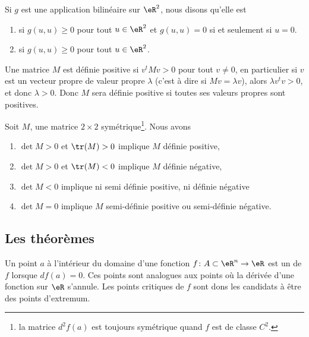 Si $g$ est une application bilinéaire sur $\eR^2$, nous disons qu'elle est
\begin{enumerate}

\item
{} si $g(u,u)\geq 0$ pour tout $u\in\eR^2$ et $g(u,u)=0$ si et seulement si $u=0$.

\item
{} si $g(u,u)\geq 0$ pour tout $u\in\eR^2$. 

\end{enumerate}

Une matrice $M$ est définie positive si $v^tMv>0$ pour tout $v\neq 0$, en particulier si $v$ est un vecteur propre de valeur propre $\lambda$ (c'est à dire si $Mv=\lambda v$), alors $\lambda v^tv>0$, et donc $\lambda>0$. Donc $M$ sera définie positive si toutes ses valeurs propres sont positives.

\begin{proposition}     \label{PropcnJyXZ}
    Soit $M$, une matrice $2\times 2$ symétrique\footnote{la matrice $d^2f(a)$ est toujours symétrique quand $f$ est de classe $C^2$.}. Nous avons
    \begin{enumerate}
        \item
        $\det M>0$ et $\tr(M)>0$ implique $M$ définie positive,
        \item
        $\det M>0$ et $\tr(M)<0$ implique $M$ définie négative,
    \item   \label{ItemluuFPN}
        $\det M<0$ implique ni semi définie positive, ni définie négative 
        \item
        $\det M=0$ implique $M$ semi-définie positive ou semi-définie négative.
    \end{enumerate}
\end{proposition}


 
                    \subsection{Les théorèmes}

Un point $a$ à l'intérieur du domaine d'une fonction $f\colon A\subset\eR^n\to \eR$ est un  de $f$ lorsque $df(a)=0$. Ces points sont analogues aux points où la dérivée d'une fonction sur $\eR$ s'annule. Les points critiques de $f$ sont dons les candidats à être des points d'extremum.

